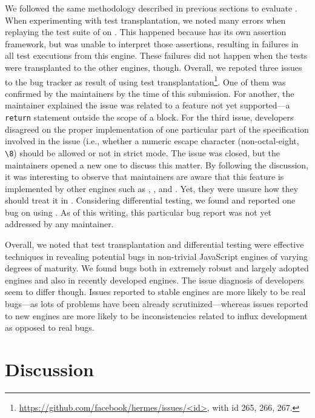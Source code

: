 \documentclass[smallextended]{svjour3}
\begin{document}
We followed the same methodology described in previous sections to
evaluate \hermes. When experimenting with test transplantation, we
noted many errors when replaying the test suite of \smonkey on
\hermes. This happened because \smonkey has its own assertion
framework, but \hermes was unable to interpret those assertions,
resulting in failures in all test executions from this engine. These
failures did not happen when the \smonkey tests were transplanted to
the other engines, though. Overall, we repoted three
issues to the \hermes bug tracker as result of using test
transplantation\footnote{\url{https://github.com/facebook/hermes/issues/<id>},
  with id 265, 266, 267.}. One of them was confirmed by the \hermes
maintainers by the time of this submission. For another, the
maintainer explained the issue was related to a feature not yet
supported---a \texttt{return} statement outside the scope of a
block. For the third issue, developers disagreed on the proper
implementation of one particular part of the specification involved in
the issue (i.e., whether a numeric escape character (non-octal-eight,
\texttt{\textbackslash{8}}) should be allowed or not in strict
mode. The issue was closed, but the maintainers opened a new one to
discuss this matter. By following the discussion, it was interesting
to observe that maintainers are aware that this feature is implemented
by other engines such as \veight, \chakra, and \smonkey. Yet, they
were unsure how they should treat it in \hermes.  Considering
differential testing, we found and reported one bug on \hermes using
\radamsa. As of this writing, this particular bug report was not yet
addressed by any \hermes maintainer.

Overall, we noted that test transplantation and differential testing
were effective techniques in revealing potential bugs in non-trivial
JavaScript engines of varying degrees of maturity. We found bugs both
in extremely robust and largely adopted engines and also in recently
developed engines. The issue diagnosis of
developers seem to differ though. Issues reported to stable engines
are more likely to be real bugs---as lots of problems have been
already scrutinized---whereas issues reported to new engines are more
likely to be inconsistencies related to influx development as opposed
to real bugs.

\section{Discussion}
\end{document}
